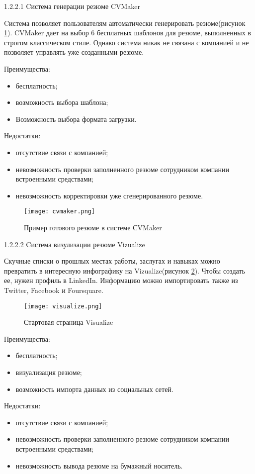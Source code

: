 1.2.2.1 Cистема генерации резюме CVMaker

Cистема позволяет пользователям автоматически генерировать резюме(рисунок \ref{fig:analysis:analogues:cvmaker}).
CVMaker дает на выбор 6 бесплатных шаблонов для резюме, выполненных в строгом классическом стиле. Однако система никак
не связана с компанией и не позволяет управлять уже созданными резюме.

Преимущества:
\begin{itemize}
	\item бесплатность;
	\item возможность выбора шаблона;
	\item Возможность выбора формата загрузки.
\end{itemize}

Недостатки:
\begin{itemize}
	\item отсутствие связи с компанией;
	\item невозможность проверки заполненного резюме сотрудником компании встроенными средствами;
	\item невозможность корректировки уже сгенерированного резюме.
\end{itemize}

\begin{figure}[!t]
	\centering
	\texttt{[image: cvmaker.png]} 
	\caption{Пример готового резюме в системе СVMaker}
	\label{fig:analysis:analogues:cvmaker}
\end{figure}

1.2.2.2 Cистема визулизации резюме Vizualize

Скучные списки о прошлых местах работы, заслугах и навыках можно превратить в интересную инфографику на
Vizualize(рисунок \ref{fig:analysis:analogues:visualize}). Чтобы создать ее, нужен профиль в LinkedIn. Информацию можно
импортировать также из Twitter, Facebook и Foursquare.

\begin{figure}[!t]
	\centering
	\texttt{[image: visualize.png]} 
	\caption{Стартовая страница Visualize}
	\label{fig:analysis:analogues:visualize}
\end{figure}

Преимущества:
\begin{itemize}
	\item бесплатность;
	\item визуализация резюме;
	\item возможность импорта данных из социальных сетей.
\end{itemize}

Недостатки:
\begin{itemize}
	\item отсутствие связи с компанией;
	\item невозможность проверки заполненного резюме сотрудником компании встроенными средствами;
	\item невозможность вывода резюме на бумажный носитель.
\end{itemize}
